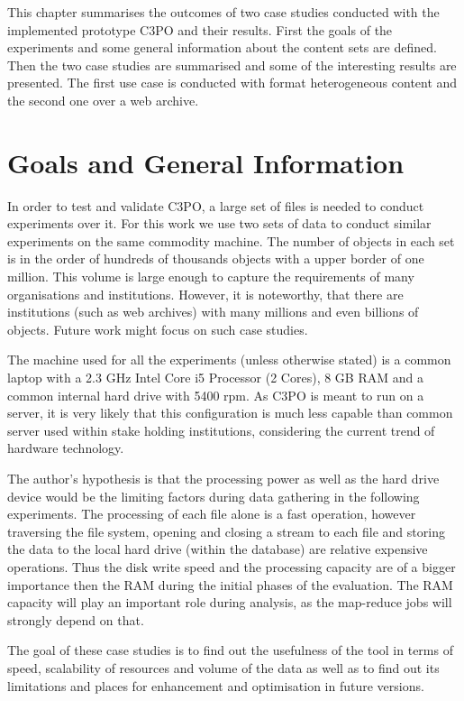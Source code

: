 This chapter summarises the outcomes of two case studies conducted with the implemented prototype C3PO and their results.
First the goals of the experiments and some general information about the content sets are defined.
Then the two case studies are summarised and some of the interesting results are presented.
The first use case is conducted with format heterogeneous content and the second one over a web archive.

\section{Goals and General Information}
In order to test and validate C3PO, a large set of files is needed to conduct experiments over it.
For this work we use two sets of data to conduct similar experiments on the same commodity machine.
The number of objects in each set is in the order of hundreds of thousands objects with a upper border of one million.
This volume is large enough to capture the requirements of many organisations and institutions.
However, it is noteworthy, that there are institutions (such as web archives) with many millions and even billions of objects.
Future work might focus on such case studies.

The machine used for all the experiments (unless otherwise stated) is a common laptop with a 2.3 GHz Intel Core i5 Processor (2 Cores), 8 GB RAM and a common internal hard drive with 5400 rpm.
As C3PO is meant to run on a server, it is very likely that this configuration is much less capable than common server used within stake holding institutions, considering the current trend of hardware technology.

The author's hypothesis is that the processing power as well as the hard drive device would be the limiting factors during data gathering in the following experiments.
The  processing of each file alone is a fast operation, however traversing the file system, opening and closing a stream to each file and storing the data to the local hard drive (within the database) are relative expensive operations.
Thus the disk write speed and the processing capacity are of a bigger importance then the RAM during the initial phases of the evaluation.
The RAM capacity will play an important role during analysis, as the map-reduce jobs will strongly depend on that.

The goal of these case studies is to find out the usefulness of the tool in terms of speed, scalability of resources and volume of the data as well as to find out its limitations and places for enhancement and optimisation in future versions.


